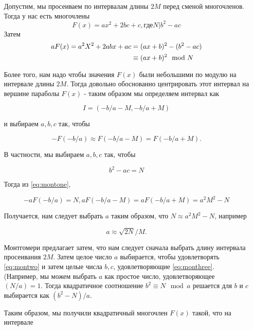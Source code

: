 \documentclass[a4paper,12pt]{report}
\begin{document}
Допустим, мы просеиваем по интервалам длины $2M$ перед сменой многочленов. Тогда у нас есть многочлены
\begin{equation*}
F(x) = ax^2+2bc+c, где N|b^2-ac
\end{equation*}
Затем
\begin{align}\label{eq:montone}
aF(x) = a^2X^2+2abx+ac &= (ax+b)^2 - (b^2-ac)\\
&\equiv (ax+b)^2 \mod N \notag
\end{align}

Более того, нам надо чтобы значения $F(x)$ были небольшими по модулю на интервале длины $2M$. Тогда довольно обоснованно центрировать этот интервал на вершине параболы $F(x)$ - таким образом мы определяем интервал как

\begin{equation*}
I = (-b/a - M, -b/a + M)
\end{equation*}

и выбираем $a, b, c$ так, чтобы 

\begin{equation*}
-F(-b/a) \approx F(-b/a - M) = F(-b/a + M).
\end{equation*}

В частности, мы выбираем $a, b, c$ так, чтобы

\begin{equation}\label{eq:montwo}
b^2 - ac = N
\end{equation}

Тогда из \eqref{eq:montone},

\begin{equation*}
-aF(-b/a) = N, aF(-b/a - M) = aF(-b/a + M) = a^2M^2 - N
\end{equation*}

Получается, нам следует выбрать $a$ таким образом, что $N \approx a^2M^2 -N$, например

\begin{equation}\label{eq:monthree}
a \approx \sqrt{2N}/M.
\end{equation}

Монтгомери предлагает затем, что нам следует сначала выбрать длину интервала просеивания $2M$. Затем целое число $a$ выбирается, чтобы удовлетворять \eqref{eq:montwo} и затем целые числа $b, c$, удовлетворяющие \eqref{eq:monthree}. (Например, мы можем выбрать $a$ как простое число, удовлетворяющее $(N/a) = 1$. Тогда квадратичное соотношение $b^2 \equiv N \mod a$ решается для $b$ и $c$ выбирается как $(b^2 -N)/a$.

Таким образом, мы получили квадратичный многочлен $F(x)$ такой, что на интервале 
\end{document}
